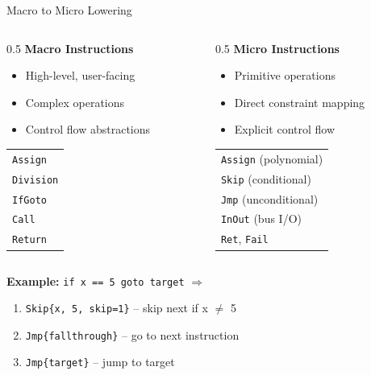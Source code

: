 \documentclass[aspectratio=169,11pt]{beamer}
\begin{document}
\begin{frame}{Macro to Micro Lowering}

\begin{columns}
\begin{column}{0.5\textwidth}
\textbf{Macro Instructions}
\begin{itemize}
    \item High-level, user-facing
    \item Complex operations
    \item Control flow abstractions
\end{itemize}

\vspace{0.5em}
\begin{table}
\small
\begin{tabular}{l}
\texttt{Assign} \\
\texttt{Division} \\
\texttt{IfGoto} \\
\texttt{Call} \\
\texttt{Return} \\
\end{tabular}
\end{table}
\end{column}

\begin{column}{0.5\textwidth}
\textbf{Micro Instructions}
\begin{itemize}
    \item Primitive operations
    \item Direct constraint mapping
    \item Explicit control flow
\end{itemize}

\vspace{0.5em}
\begin{table}
\small
\begin{tabular}{l}
\texttt{Assign} (polynomial) \\
\texttt{Skip} (conditional) \\
\texttt{Jmp} (unconditional) \\
\texttt{InOut} (bus I/O) \\
\texttt{Ret}, \texttt{Fail} \\
\end{tabular}
\end{table}
\end{column}
\end{columns}

\vspace{0.5em}

\textbf{Example:} \texttt{if x == 5 goto target} $\Rightarrow$
\begin{enumerate}
    \item \texttt{Skip\{x, 5, skip=1\}} -- skip next if x $\neq$ 5
    \item \texttt{Jmp\{fallthrough\}} -- go to next instruction
    \item \texttt{Jmp\{target\}} -- jump to target
\end{enumerate}
\end{frame}
\end{document}
